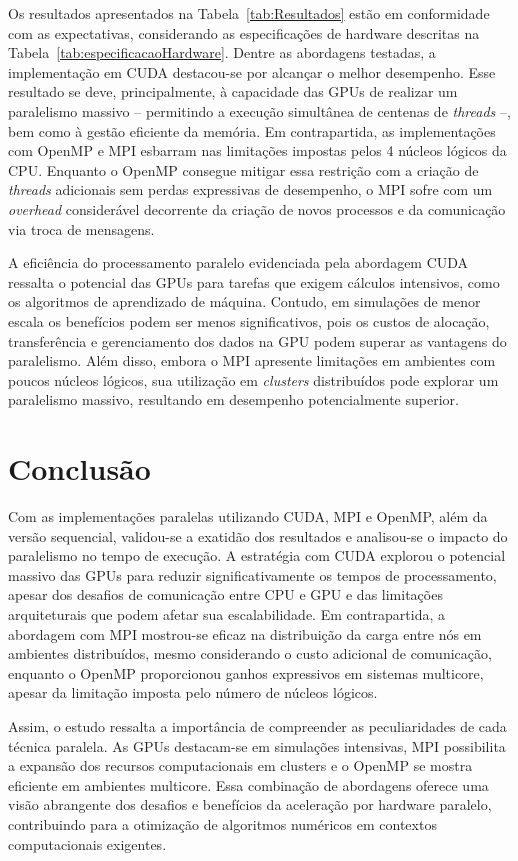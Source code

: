 \documentclass[12pt]{article}
\begin{document}
Os resultados apresentados na Tabela~\ref{tab:Resultados} estão em conformidade
com as expectativas, considerando as especificações de hardware descritas na
Tabela~\ref{tab:especificacaoHardware}. Dentre as abordagens testadas, a
implementação em CUDA destacou-se por alcançar o melhor desempenho. Esse
resultado se deve, principalmente, à capacidade das GPUs de realizar um
paralelismo massivo – permitindo a execução simultânea de centenas de
\textit{threads} –, bem como à gestão eficiente da memória. Em contrapartida,
as implementações com OpenMP e MPI esbarram nas limitações impostas pelos 4
núcleos lógicos da CPU. Enquanto o OpenMP consegue mitigar essa restrição com a
criação de \textit{threads} adicionais sem perdas expressivas de desempenho, o
MPI sofre com um \textit{overhead} considerável decorrente da criação de novos
processos e da comunicação via troca de mensagens.

A eficiência do processamento paralelo evidenciada pela abordagem CUDA ressalta
o potencial das GPUs para tarefas que exigem cálculos intensivos, como os
algoritmos de aprendizado de máquina. Contudo, em simulações de menor escala os
benefícios podem ser menos significativos, pois os custos de alocação,
transferência e gerenciamento dos dados na GPU podem superar as vantagens do
paralelismo. Além disso, embora o MPI apresente limitações em ambientes com
poucos núcleos lógicos, sua utilização em \textit{clusters} distribuídos pode
explorar um paralelismo massivo, resultando em desempenho potencialmente
superior.

\section{Conclusão}

Com as implementações paralelas utilizando CUDA, MPI e OpenMP, além da versão
sequencial, validou-se a exatidão dos resultados e analisou-se o impacto do
paralelismo no tempo de execução. A estratégia com CUDA explorou o potencial
massivo das GPUs para reduzir significativamente os tempos de processamento,
apesar dos desafios de comunicação entre CPU e GPU e das limitações
arquiteturais que podem afetar sua escalabilidade. Em contrapartida, a
abordagem com MPI mostrou-se eficaz na distribuição da carga entre nós em
ambientes distribuídos, mesmo considerando o custo adicional de comunicação,
enquanto o OpenMP proporcionou ganhos expressivos em sistemas multicore, apesar
da limitação imposta pelo número de núcleos lógicos.

Assim, o estudo ressalta a importância de compreender as peculiaridades de
cada técnica paralela. As GPUs destacam-se em simulações intensivas, MPI
possibilita a expansão dos recursos computacionais em clusters e o OpenMP se
mostra eficiente em ambientes multicore. Essa combinação de abordagens oferece
uma visão abrangente dos desafios e benefícios da aceleração por hardware
paralelo, contribuindo para a otimização de algoritmos numéricos em contextos
computacionais exigentes.



\nocite{*}
\end{document}
